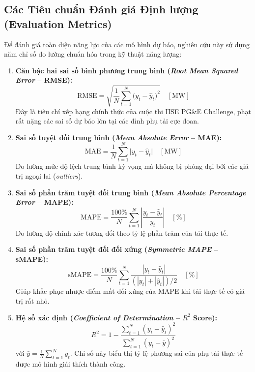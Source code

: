 \subsection{Các Tiêu chuẩn Đánh giá Định lượng (Evaluation Metrics)}
Để đánh giá toàn diện năng lực của các mô hình dự báo, nghiên cứu này sử dụng năm chỉ số đo lường chuẩn hóa trong kỹ thuật năng lượng:
\begin{enumerate}
    \item \textbf{Căn bậc hai sai số bình phương trung bình (\textit{Root Mean Squared Error} -- RMSE):}
    \begin{equation}
        \text{RMSE} = \sqrt{\frac{1}{N} \sum_{t=1}^N \big(y_t - \hat{y}_t\big)^2} \quad [\text{MW}]
    \end{equation}
    Đây là tiêu chí xếp hạng chính thức của cuộc thi IISE PG\&E Challenge, phạt rất nặng các sai số dự báo lớn tại các đỉnh phụ tải cực đoan.
    \item \textbf{Sai số tuyệt đối trung bình (\textit{Mean Absolute Error} -- MAE):}
    \begin{equation}
        \text{MAE} = \frac{1}{N} \sum_{t=1}^N \big|y_t - \hat{y}_t\big| \quad [\text{MW}]
    \end{equation}
    Đo lường mức độ lệch trung bình kỳ vọng mà không bị phóng đại bởi các giá trị ngoại lai (\textit{outliers}).
    \item \textbf{Sai số phần trăm tuyệt đối trung bình (\textit{Mean Absolute Percentage Error} -- MAPE):}
    \begin{equation}
        \text{MAPE} = \frac{100\%}{N} \sum_{t=1}^N \left| \frac{y_t - \hat{y}_t}{y_t} \right| \quad [\%]
    \end{equation}
    Đo lường độ chính xác tương đối theo tỷ lệ phần trăm của tải thực tế.
    \item \textbf{Sai số phần trăm tuyệt đối đối xứng (\textit{Symmetric MAPE} -- sMAPE):}
    \begin{equation}
        \text{sMAPE} = \frac{100\%}{N} \sum_{t=1}^N \frac{|y_t - \hat{y}_t|}{(|y_t| + |\hat{y}_t|)/2} \quad [\%]
    \end{equation}
    Giúp khắc phục nhược điểm mất đối xứng của MAPE khi tải thực tế có giá trị rất nhỏ.
    \item \textbf{Hệ số xác định (\textit{Coefficient of Determination} -- $R^2$ Score):}
    \begin{equation}
        R^2 = 1 - \frac{\sum_{t=1}^N (y_t - \hat{y}_t)^2}{\sum_{t=1}^N (y_t - \bar{y})^2}
    \end{equation}
    với $\bar{y} = \frac{1}{N}\sum_{t=1}^N y_t$. Chỉ số này biểu thị tỷ lệ phương sai của phụ tải thực tế được mô hình giải thích thành công.
\end{enumerate}

